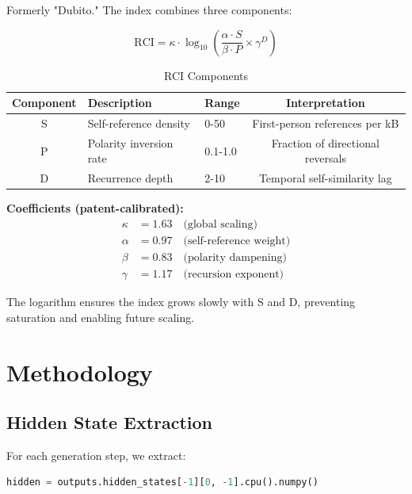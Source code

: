 \documentclass[12pt,a4paper]{article}
\begin{document}
Formerly "Dubito." The index combines three components:

\begin{equation}
\boxed{\text{RCI} = \kappa \cdot \log_{10}\left( \frac{\alpha \cdot S}{\beta \cdot P} \times \gamma^{D} \right)}
\end{equation}

\begin{table}[h]
\centering
\caption{RCI Components}
\begin{tabular}{cllc}
\toprule
\textbf{Component} & \textbf{Description} & \textbf{Range} & \textbf{Interpretation} \\
\midrule
S & Self-reference density & 0-50 & First-person references per kB \\
P & Polarity inversion rate & 0.1-1.0 & Fraction of directional reversals \\
D & Recurrence depth & 2-10 & Temporal self-similarity lag \\
\bottomrule
\end{tabular}
\end{table}

\noindent
\textbf{Coefficients (patent-calibrated):}
\begin{align*}
\kappa &= 1.63 \quad \text{(global scaling)} \\
\alpha &= 0.97 \quad \text{(self-reference weight)} \\
\beta &= 0.83 \quad \text{(polarity dampening)} \\
\gamma &= 1.17 \quad \text{(recursion exponent)}
\end{align*}

The logarithm ensures the index grows slowly with S and D, preventing saturation and enabling future scaling.

\section{Methodology}

\subsection{Hidden State Extraction}

For each generation step, we extract:

\begin{lstlisting}[language=Python, caption=Hidden State Extraction]
hidden = outputs.hidden_states[-1][0, -1].cpu().numpy()
\end{lstlisting}
\end{document}

